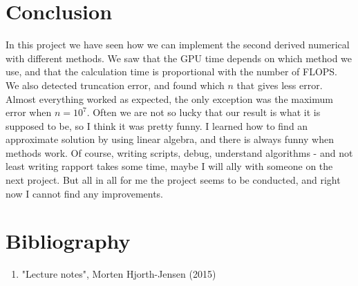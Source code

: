 \documentclass{scrartcl}
\begin{document}
\section{Conclusion}
In this project we have seen how we can implement the second derived numerical with different methods. We saw that the GPU time depends on which method we use, and that the calculation time is proportional with the number of FLOPS. We also detected truncation error, and found which $n$ that gives less error. Almost everything worked as expected, the only exception was the maximum error when $n=10^7$. Often we are not so lucky that our result is what it is supposed to be, so I think it was pretty funny. I learned how to find an approximate solution by using linear algebra, and there is always funny when methods work. Of course, writing scripts, debug, understand algorithms - and not least writing rapport takes some time, maybe I will ally with someone on the next project. But all in all for me the project seems to be conducted, and right now I cannot find any improvements.

\section{Bibliography}
\begin{enumerate}
\item "Lecture notes", Morten Hjorth-Jensen (2015)
\end{enumerate}
\end{document}

